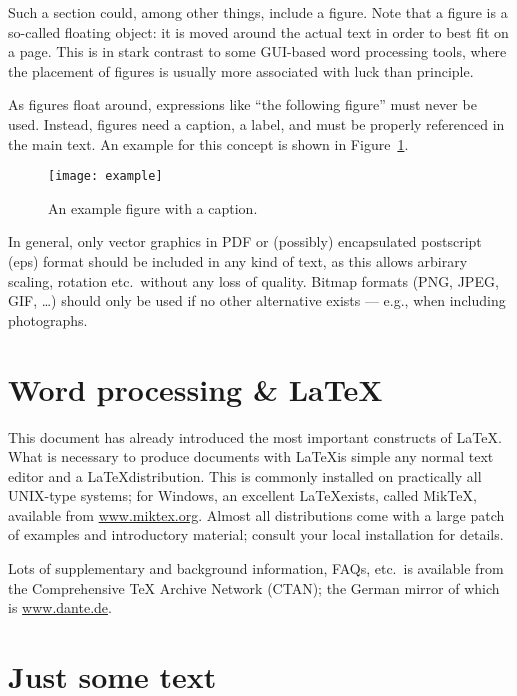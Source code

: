 Such a section could, among other things, include a figure. Note that
a figure is a so-called floating object: it is moved around the actual
text in order to best fit on a page. This is in stark contrast to some
GUI-based word processing tools, where the placement of figures is
usually more associated with luck than principle.

As figures float around, expressions like ``the following figure''
must never be used. Instead, figures need a caption, a label, and must
be properly referenced in the main text. An example for this concept
is shown in Figure~\ref{fig:example}. 

\begin{figure}[htbp]
  \begin{center}
    \texttt{[image: example]}
    \caption{An example figure with a caption.}
    \label{fig:example}
  \end{center}
\end{figure}

In general, only vector graphics in PDF or (possibly) encapsulated
postscript (eps) format should be included in any kind of text, as
this allows arbirary scaling, rotation etc.\ without any loss of
quality. Bitmap formats (PNG, JPEG, GIF, \dots) should only be used if no
other alternative exists --- e.g., when including photographs. 

\section{Word processing \& \LaTeX}
\label{sec:latex} 

This document has already introduced the most important constructs of
\LaTeX. What is necessary to produce documents with \LaTeX is simple
any normal text editor and a \LaTeX distribution. This is commonly
installed on practically all UNIX-type systems; for Windows, an
excellent \LaTeX exists, called MikTeX, available from
\url{www.miktex.org}. Almost all distributions come with a large patch
of examples and introductory material; consult your local installation
for details. 

Lots of supplementary and background information, FAQs, etc.\ is
available from the Comprehensive TeX Archive Network (CTAN); the
German mirror of which is \url{www.dante.de}. 


\section{Just some text}
\label{sec:just-some-text}

